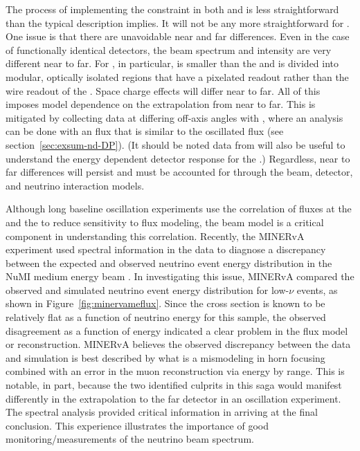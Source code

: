 The process of implementing the   constraint in both  and    is less straightforward than the typical description implies.  It will not be any more straightforward for .  One issue is that there are unavoidable near and far differences. Even in the case of functionally identical detectors, the beam spectrum and intensity are very different near to far.  For , in particular, 
 is smaller than the  and is divided into modular, optically isolated regions that have a pixelated readout rather than the wire readout of the .  Space charge effects will differ near to far.  All of this imposes model dependence on the extrapolation from near to far.  This is mitigated by collecting data at differing off-axis angles with , where an analysis can be done with an  flux that is similar to the oscillated  flux (see section~\ref{sec:exsum-nd-DP}). (It should be noted data from  will also be useful to understand the energy dependent detector response for the .)  Regardless, near to far differences will persist and must be accounted for through the beam, detector, and neutrino interaction models.  

Although long baseline oscillation experiments use the correlation of fluxes at the  and the  to reduce sensitivity to flux modeling, the beam model is a critical component in understanding this correlation.  Recently, the MINERvA experiment used spectral information in the data to diagnose a discrepancy between the expected and observed neutrino event energy distribution in the NuMI medium energy beam \cite{JenaNUINT2018}. In investigating this issue, MINERvA compared the observed and simulated neutrino event energy distribution for low-$\nu$ events, as shown in Figure~\ref{fig:minervameflux}.  Since the cross section is known to be relatively flat as a function of neutrino energy for this sample, the observed disagreement as a function of energy indicated a clear problem in the flux model or reconstruction.      
MINERvA believes the observed discrepancy between the data and simulation is best described by what is a mismodeling in horn focusing combined with an error in the muon reconstruction via energy by range.  This is notable, in part, because the two identified culprits in this saga would manifest differently in the extrapolation to the far detector in an oscillation experiment. The spectral analysis provided critical information in arriving at the final conclusion.  This experience illustrates the importance of good monitoring/measurements of the neutrino beam spectrum.  

